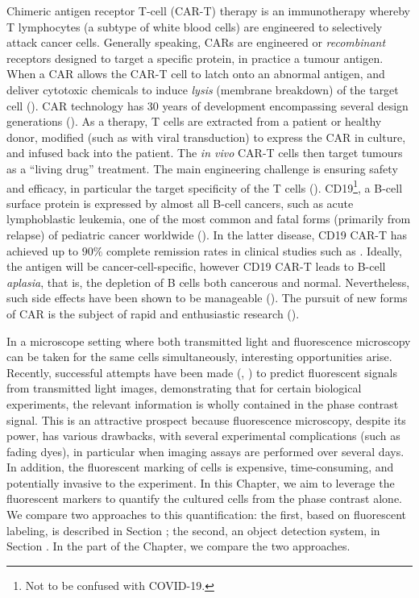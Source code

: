 Chimeric antigen receptor T-cell (CAR-T) therapy is an immunotherapy whereby T lymphocytes (a subtype of white blood cells) are engineered to selectively attack cancer cells. Generally speaking, CARs are engineered or \emph{recombinant} receptors designed to target a specific protein, in practice a tumour antigen. When a CAR allows the CAR-T cell to latch onto an abnormal antigen, and deliver cytotoxic chemicals to induce \emph{lysis}  (membrane breakdown) of the target cell (\cite{benmebarek2019killing}). CAR technology has 30 years of development encompassing several design generations (\cite{maude2015cd19}).  As a therapy, T cells are extracted from a patient or healthy donor, modified (such as with viral transduction) to express the CAR in culture, and infused back into the patient. The \emph{in vivo} CAR-T cells then target tumours as a ``living drug'' treatment. The main engineering challenge is ensuring safety and efficacy, in particular the target specificity of the T cells (\cite{sadelainbasic}). CD19\footnote{Not to be confused with COVID-19.}, a B-cell surface protein is expressed by almost all B-cell cancers, such as acute lymphoblastic leukemia, one of the most common and fatal forms (primarily from relapse) of pediatric cancer worldwide (\cite{hunger2015acute}). In the latter disease, CD19 CAR-T has achieved up to $90\%$ complete remission rates in clinical studies such as \cite{maude2014chimeric}. Ideally, the antigen will be cancer-cell-specific, however CD19 CAR-T leads to B-cell \emph{aplasia}, that is, the depletion of B cells both cancerous and normal. Nevertheless, such side effects have been shown to be manageable (\cite{bonifant2016toxicity}). The pursuit of new forms of CAR is the subject of rapid and enthusiastic research (\cite{wang2017current}).

In a microscope setting where both transmitted light and fluorescence microscopy can be taken for the same cells simultaneously, interesting opportunities arise. Recently, successful attempts have been made (\cite{christiansen2018silico}, \cite{ounkomol2018label}) to predict fluorescent signals from transmitted light images, demonstrating that for certain biological experiments, the relevant information is wholly contained in the phase contrast signal. This is an attractive prospect because fluorescence microscopy, despite its power, has various drawbacks, with several experimental complications (such as fading dyes), in particular when imaging assays are performed over several days. In addition, the fluorescent marking of cells is expensive, time-consuming, and potentially invasive to the experiment. In this Chapter, we aim to leverage the fluorescent markers to quantify the cultured cells from the phase contrast alone. We compare two approaches to this quantification: the first, based on fluorescent labeling, is described in Section \label{sec:fluorescent_labeling}; the second, an object detection system, in Section \label{sec:object_detection_system}. In the part of the Chapter, we compare the two approaches.

